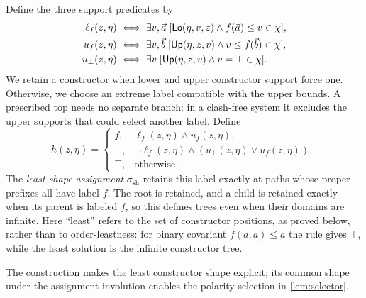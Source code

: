 Define the three support predicates by
\begin{equation}\label{eq:shape-supports}
\begin{aligned}
\ell_f(z,\eta)&\iff\exists v,\vec a\;[\mathsf{Lo}(\eta,v,z)\land f(\vec a)\le v\in\chi],\\
u_f(z,\eta)&\iff\exists v,\vec b\;[\mathsf{Up}(\eta,z,v)\land v\le f(\vec b)\in\chi],\\
u_\bot(z,\eta)&\iff\exists v\;[\mathsf{Up}(\eta,z,v)\land v=\bot\in\chi].
\end{aligned}
\end{equation}
We retain a constructor when lower and upper constructor support force
one. Otherwise, we choose an extreme label compatible with the upper
bounds. A prescribed top needs no separate branch: in a clash-free
system it excludes the upper supports that could select another label.
Define
\begin{equation}\label{eq:g27}
 h(z,\eta)=
 \begin{cases}
 f,&\ell_f(z,\eta)\land u_f(z,\eta),\\
 \bot,&\neg\ell_f(z,\eta)\land(u_\bot(z,\eta)\lor u_f(z,\eta)),\\
 \top,&\text{otherwise}.
 \end{cases}
\end{equation}
The \emph{least-shape assignment} $\sigma_{\mathrm{sh}}$ retains this
label exactly at paths whose proper prefixes all have label $f$.
The root is retained, and a child is retained exactly when its parent is
labeled $f$, so this defines trees even when their domains are infinite.
Here ``least'' refers to the set of constructor positions, as proved
below, rather than to order-leastness: for binary covariant $f(a,a)\le a$
the rule gives $\top$, while the least solution is the infinite constructor tree.

The construction makes the least constructor shape explicit; its
common shape under the assignment involution enables the polarity
selection in \cref{lem:selector}.

